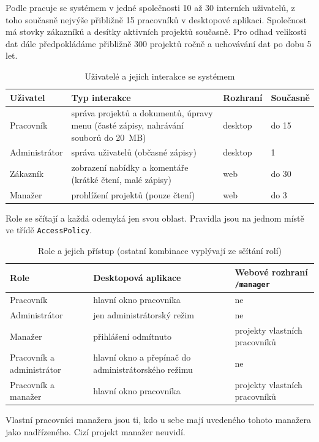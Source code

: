 Podle  pracuje se systémem v jedné společnosti 10 až 30 interních uživatelů, z toho současně nejvýše přibližně 15 pracovníků v desktopové aplikaci. Společnost má stovky zákazníků a desítky aktivních projektů současně. Pro odhad velikosti dat dále předpokládáme přibližně 300 projektů ročně a uchovávání dat po dobu 5 let.

\begin{table}[H]
\centering
\begin{tabularx}{\textwidth}{lXll}
\toprule
\textbf{Uživatel} & \textbf{Typ interakce} & \textbf{Rozhraní} & \textbf{Současně} \\
\midrule
Pracovník & správa projektů a dokumentů, úpravy menu (časté zápisy, nahrávání souborů do 20~MB) & desktop & do 15 \\
Administrátor & správa uživatelů (občasné zápisy) & desktop & 1 \\
Zákazník & zobrazení nabídky a komentáře (krátké čtení, malé zápisy) & web & do 30 \\
Manažer & prohlížení projektů (pouze čtení) & web & do 3 \\
\bottomrule
\end{tabularx}
\caption{Uživatelé a jejich interakce se systémem}
\end{table}

Role se sčítají a každá odemyká jen svou oblast. Pravidla jsou na jednom místě ve třídě \texttt{AccessPolicy}.

\begin{table}[H]
\centering
\begin{tabularx}{\textwidth}{lXX}
\toprule
\textbf{Role} & \textbf{Desktopová aplikace} & \textbf{Webové rozhraní \texttt{/manager}} \\
\midrule
Pracovník & hlavní okno pracovníka & ne \\
Administrátor & jen administrátorský režim & ne \\
Manažer & přihlášení odmítnuto & projekty vlastních pracovníků \\
Pracovník a administrátor & hlavní okno a přepínač do administrátorského režimu & ne \\
Pracovník a manažer & hlavní okno pracovníka & projekty vlastních pracovníků \\
\bottomrule
\end{tabularx}
\caption{Role a jejich přístup (ostatní kombinace vyplývají ze sčítání rolí)}
\end{table}

Vlastní pracovníci manažera jsou ti, kdo u sebe mají uvedeného tohoto manažera jako nadřízeného. Cizí projekt manažer neuvidí.

